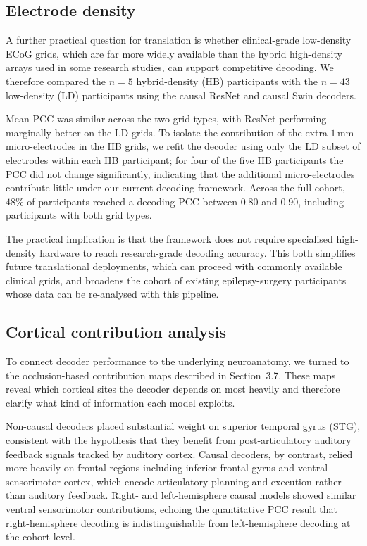 \documentclass[11pt]{article}
\begin{document}
\subsection{Electrode density}

A further practical question for translation is whether clinical-grade
low-density ECoG grids, which are far more widely available than the
hybrid high-density arrays used in some research studies, can support
competitive decoding. We therefore compared the $n=5$ hybrid-density (HB)
participants with the $n=43$ low-density (LD) participants using the
causal ResNet and causal Swin decoders.

Mean PCC was similar across the two grid types, with ResNet performing
marginally better on the LD grids. To isolate the contribution of the
extra $1\,\mathrm{mm}$ micro-electrodes in the HB grids, we refit the
decoder using only the LD subset of electrodes within each HB
participant; for four of the five HB participants the PCC did not change
significantly, indicating that the additional micro-electrodes contribute
little under our current decoding framework. Across the full cohort,
$48\%$ of participants reached a decoding PCC between $0.80$ and $0.90$,
including participants with both grid types.

The practical implication is that the framework does not require
specialised high-density hardware to reach research-grade decoding
accuracy. This both simplifies future translational deployments, which
can proceed with commonly available clinical grids, and broadens the
cohort of existing epilepsy-surgery participants whose data can be
re-analysed with this pipeline.

\subsection{Cortical contribution analysis}

To connect decoder performance to the underlying neuroanatomy, we turned
to the occlusion-based contribution maps described in Section~3.7. These
maps reveal which cortical sites the decoder depends on most heavily and
therefore clarify what kind of information each model exploits.

Non-causal decoders placed substantial weight on superior temporal gyrus
(STG), consistent with the hypothesis that they benefit from
post-articulatory auditory feedback signals tracked by auditory cortex.
Causal decoders, by contrast, relied more heavily on frontal regions
including inferior frontal gyrus and ventral sensorimotor cortex, which
encode articulatory planning and execution rather than auditory feedback.
Right- and left-hemisphere causal models showed similar ventral
sensorimotor contributions, echoing the quantitative PCC result that
right-hemisphere decoding is indistinguishable from left-hemisphere
decoding at the cohort level.
\end{document}
